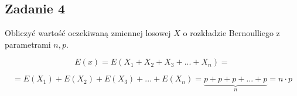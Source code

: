 \subsection{Zadanie 4}

Obliczyć wartość oczekiwaną zmiennej losowej $X$ o rozkładzie Bernoulliego z parametrami $n,p$.

$$
E(x) = E(X_{1} + X_{2} + X_{3} + ... + X_{n}) = 
$$
 
$$
= E(X_{1}) + E(X_{2}) + E(X_{3}) + ... + E(X_{n}) = 
\underbrace{p + p + p + ... + p}_{n} = n \cdot p
$$

